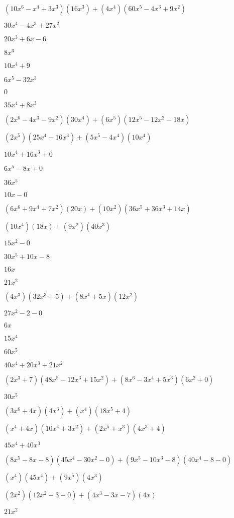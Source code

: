 \documentclass{article}
\begin{document}
\begin{multicols}{2}
$(10x^{6}-x^{4}+3x^{3})(16x^{3})+(4x^{4})(60x^{5}-4x^{3}+9x^{2})$\item $30x^{4}-4x^{3}+27x^{2}$\item $20x^{3}+6x-6$\item $8x^{3}$\item $10x^{4}+9$\item $6x^{5}-32x^{3}$\item $0$\item $35x^{4}+8x^{3}$\item $(2x^{6}-4x^{3}-9x^2)(30x^{4})+(6x^{5})(12x^{5}-12x^{2}-18x)$\item $(2x^{5})(25x^{4}-16x^{3})+(5x^{5}-4x^{4})(10x^{4})$\item $10x^{4}+16x^{3}+0$\item $6x^{5}-8x+0$\item $36x^{5}$\item $10x-0$\item $(6x^{6}+9x^{4}+7x^2)(20x)+(10x^2)(36x^{5}+36x^{3}+14x)$\item $(10x^{4})(18x)+(9x^2)(40x^{3})$\item $15x^{2}-0$\item $30x^{5}+10x-8$\item $16x$\item $21x^{2}$\item $(4x^{3})(32x^{3}+5)+(8x^{4}+5x)(12x^{2})$\item $27x^{2}-2-0$\item $6x$\item $15x^{4}$\item $60x^{5}$\item $40x^{4}+20x^{3}+21x^{2}$\item $(2x^{3}+7)(48x^{5}-12x^{3}+15x^{2})+(8x^{6}-3x^{4}+5x^{3})(6x^{2}+0)$\item $30x^{5}$\item $(3x^{6}+4x)(4x^{3})+(x^{4})(18x^{5}+4)$\item $(x^{4}+4x)(10x^{4}+3x^{2})+(2x^{5}+x^{3})(4x^{3}+4)$\item $45x^{4}+40x^{3}$\item $(8x^{5}-8x-8)(45x^{4}-30x^{2}-0)+(9x^{5}-10x^{3}-8)(40x^{4}-8-0)$\item $(x^{4})(45x^{4})+(9x^{5})(4x^{3})$\item $(2x^2)(12x^{2}-3-0)+(4x^{3}-3x-7)(4x)$\item $21x^{2}$\item 
\end{multicols}
\end{document}
